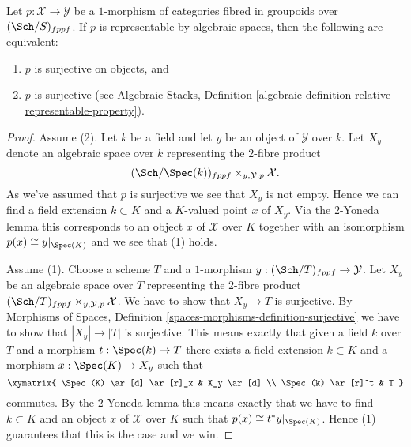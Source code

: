 \begin{lemma}
\label{lemma-representable-by-spaces-surjective}
Let $p : \mathcal{X} \to \mathcal{Y}$ be a $1$-morphism of categories
fibred in groupoids over $(\Sch/S)_{fppf}$. If $p$ is
representable by algebraic spaces, then the following are equivalent:
\begin{enumerate}
\item $p$ is surjective on objects, and
\item $p$ is surjective (see
Algebraic Stacks,
Definition \ref{algebraic-definition-relative-representable-property}).
\end{enumerate}
\end{lemma}

\begin{proof}
Assume (2). Let $k$ be a field and let $y$ be an object of
$\mathcal{Y}$ over $k$. Let $X_y$ denote an algebraic space over $k$
representing the $2$-fibre product
$$
(\Sch/\Spec(k))_{fppf} \times_{y, \mathcal{Y}, p} \mathcal{X}.
$$
As we've assumed that $p$ is surjective we see that $X_y$ is not empty.
Hence we can find a field extension $k \subset K$ and a $K$-valued point
$x$ of $X_y$. Via the $2$-Yoneda lemma this corresponds to an object
$x$ of $\mathcal{X}$ over $K$ together with an isomorphism
$p(x) \cong y|_{\Spec(K)}$ and we see that (1) holds.

\medskip\noindent
Assume (1). Choose a scheme $T$ and a $1$-morphism
$y : (\Sch/T)_{fppf} \to \mathcal{Y}$. Let
$X_y$ be an algebraic space over $T$ representing the $2$-fibre product
$(\Sch/T)_{fppf} \times_{y, \mathcal{Y}, p} \mathcal{X}$.
We have to show that $X_y \to T$ is surjective. By
Morphisms of Spaces, Definition \ref{spaces-morphisms-definition-surjective}
we have to show that $|X_y| \to |T|$ is surjective.
This means exactly that given a field $k$ over $T$ and a
morphism $t : \Spec(k) \to T$ there exists a field extension
$k \subset K$ and a morphism $x : \Spec(K) \to X_y$ such that
$$
\xymatrix{
\Spec(K) \ar[d] \ar[r]_x & X_y \ar[d] \\
\Spec(k) \ar[r]^t & T
}
$$
commutes. By the $2$-Yoneda lemma this means exactly that we have to find
$k \subset K$ and an object $x$ of $\mathcal{X}$ over $K$ such that
$p(x) \cong t^*y|_{\Spec(K)}$. Hence (1) guarantees that this is
the case and we win.
\end{proof}












